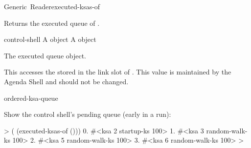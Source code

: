 \documentclass[10pt,twoside,english,pdftex]{article}
\begin{document}
\begin{functiondoc}{Generic~Reader}{executed-ksas-of}{ 
    }
%
%

\fnsyntax

\fnpurpose Returns the executed  queue of
.

\fnmethods
{}

\fnpackage {}

\fnmodule {}

\fnargs
\begin{args}{control-shell}
 A  object
 A \textbf{} object
\end{args}

\fnreturns The executed  queue object.

\fndescription 
%
This  accesses the 
stored in the  link slot of . This value
is maintained by the Agenda Shell and should not be changed.

\begin{alsos}{ordered-ksa-queue}
\also[ksa]
\also[on-queue-p]
\also[queue]
\end{alsos}

\fnexample
%
%
%
%
%
Show the control shell's pending  queue (early in a
 run):
%
\W\supp
\begin{example}
  >  ( (executed-ksas-of ()))
      0. #<ksa 2 startup-ks 100>
      1. #<ksa 3 random-walk-ks 100>
      2. #<ksa 5 random-walk-ks 100>
      3. #<ksa 6 random-walk-ks 100>
  >
\end{example}

\end{functiondoc}

\end{document}
